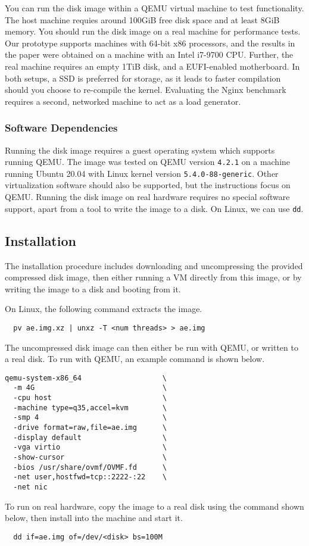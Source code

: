 You can run the disk image within a QEMU virtual machine to test
functionality.
The host machine requies around 100GiB free disk space and at least
8GiB memory.
You should run the disk image on a real machine for performance
tests.
Our \midas{} prototype supports machines with 64-bit x86 processors, 
and the results in the paper were obtained on a machine with an 
Intel i7-9700 CPU.
Further, the real machine requires an empty 1TiB disk, and a 
EUFI-enabled motherboard.
In both setups, a SSD is preferred for storage, as it leads to
faster compilation should you choose to re-compile the kernel.
Evaluating the Nginx benchmark requires a second, networked machine
to act as a load generator.

\subsubsection{Software Dependencies}

Running the \midas{} disk image requires a guest operating system
which supports running QEMU.
The image was tested on QEMU version \texttt{4.2.1} on a machine running
Ubuntu 20.04 with Linux kernel version \texttt{5.4.0-88-generic}.
Other virtualization software should also be supported, but the 
instructions focus on QEMU.
Running the disk image on real hardware requires no special software 
support, apart from a tool to write the image to a disk.
On Linux, we can use \texttt{dd}.

\subsection{Installation}

The installation procedure includes downloading and uncompressing 
the provided compressed disk image, then either running a VM directly
from this image, or by writing the image to a disk and booting from it.

On Linux, the following command extracts the image.
\begin{verbatim}
  pv ae.img.xz | unxz -T <num threads> > ae.img
\end{verbatim}
The uncompressed disk image can then either be run with QEMU, or 
written to a real disk.
To run with QEMU, an example command is shown below.
\begin{verbatim}
qemu-system-x86_64                   \
  -m 4G                              \
  -cpu host                          \
  -machine type=q35,accel=kvm        \
  -smp 4                             \
  -drive format=raw,file=ae.img      \
  -display default                   \
  -vga virtio                        \
  -show-cursor                       \
  -bios /usr/share/ovmf/OVMF.fd      \
  -net user,hostfwd=tcp::2222-:22    \
  -net nic
\end{verbatim}
To run on real hardware, copy the image to a real disk using the 
command shown below, then install into the machine and start it.
\begin{verbatim}
  dd if=ae.img of=/dev/<disk> bs=100M
\end{verbatim}

